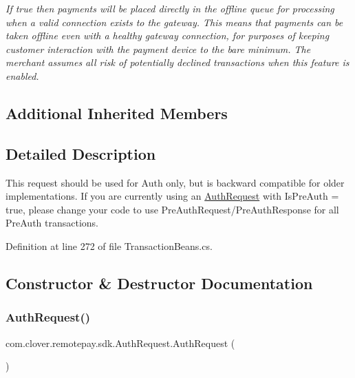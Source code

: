 \begin{DoxyCompactItemize}
\begin{DoxyCompactList}\small\item\em If true then payments will be placed directly in the offline queue for processing when a valid connection exists to the gateway. This means that payments can be taken offline even with a healthy gateway connection, for purposes of keeping customer interaction with the payment device to the bare minimum. The merchant assumes all risk of potentially declined transactions when this feature is enabled. \end{DoxyCompactList}\end{DoxyCompactItemize}
\subsection*{Additional Inherited Members}


\subsection{Detailed Description}
This request should be used for Auth only, but is backward compatible for older implementations. If you are currently using an \hyperlink{classcom_1_1clover_1_1remotepay_1_1sdk_1_1_auth_request}{Auth\+Request} with Is\+Pre\+Auth = true, please change your code to use Pre\+Auth\+Request/\+Pre\+Auth\+Response for all Pre\+Auth transactions. 



Definition at line 272 of file Transaction\+Beans.\+cs.



\subsection{Constructor \& Destructor Documentation}
\mbox{\label{classcom_1_1clover_1_1remotepay_1_1sdk_1_1_auth_request_a401d74319332020bca3167a17f12b07c}} 
\subsubsection{\texorpdfstring{Auth\+Request()}{AuthRequest()}}
{\footnotesize\ttfamily com.\+clover.\+remotepay.\+sdk.\+Auth\+Request.\+Auth\+Request (\begin{DoxyParamCaption}{ }\end{DoxyParamCaption})}



